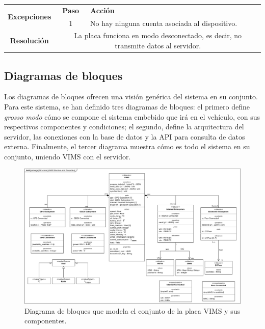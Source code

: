 \begin{table}[H]
\begin{tabularx}{\textwidth}{|c|c|X|}
    \hline
    \multirow{2}{*}{\textbf{Excepciones}}      & \textbf{Paso}                                                                                                                       & \textbf{Acción}                                                                                                                         \\
    \cline{2-3}
                                               & 1                                                                                                                                   & \multicolumn{1}{L|}{No hay ninguna cuenta asociada al dispositivo.}                                                                     \\
    \hline\hline
    \textbf{Resolución}                        & \multicolumn{2}{X|}{La placa funciona en modo desconectado, es decir, no transmite datos al servidor.}                                                                                                                                                      \\
    \hline
  \end{tabularx}
\end{table}

\subsection{Diagramas de bloques}\label{ssec:block-diagrams}

Los diagramas de bloques ofrecen una visión genérica del sistema en su conjunto. Para
este sistema, se han definido tres diagramas de bloques: el primero define \textit{grosso modo}
cómo se compone el sistema embebido que irá en el vehículo, con sus respectivos
componentes y condiciones; el segundo, define la arquitectura del servidor, las conexiones
con la base de datos y la \ac{API} para consulta de datos externa. Finalmente, el
tercer diagrama muestra cómo es todo el sistema en su conjunto, uniendo \ac{VIMS}
con el servidor.

\begin{figure}[H]
  \centering
  \includegraphics[width=\linewidth]{images/BlockDiagrams-VIMS.drawio.png}
  \caption{Diagrama de bloques que modela el conjunto de la placa \ac{VIMS} y sus componentes.}
  \label{bd:vims}
\end{figure}

